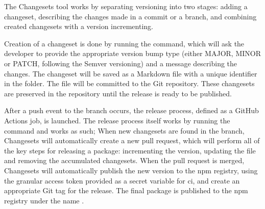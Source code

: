The Changesets tool works by separating versioning into two stages: adding a changeset, describing the changes made in a commit or a branch, and combining created changesets with a version incrementing.

Creation of a changeset is done by running the  command, which will ask the developer to provide the appropriate version bump type (either MAJOR, MINOR or PATCH, following the Semver versioning) and a message describing the changes. The changeset will be saved as a Markdown file with a unique identifier in the  folder. The file will be committed to the Git repository. These changesets are preserved in the repository until the release is ready to be published.

After a push event to the  branch occurs, the release process, defined as a GitHub Actions job, is launched. The release process itself works by running the  command and works as such; When new changesets are found in the  branch, Changesets will automatically create a new pull request, which will perform all of the key steps for releasing a package: incrementing the version, updating the  file and removing the accumulated changesets. When the pull request is merged, Changesets will automatically publish the new version to the \acrshort{npm} registry, using the granular access token provided as a secret variable for \acrshort{ci}, and create an appropriate Git tag for the release. The final package is published to the \acrshort{npm} registry under the name  \cite{Tsmathevaluate2023}. 